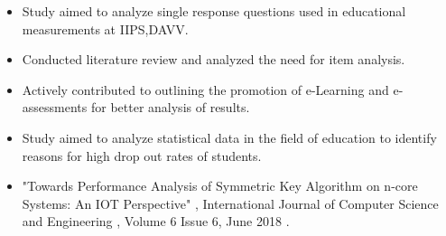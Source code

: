 \documentclass[10pt,a4paper]{altacv}
\begin{document}
\begin{itemize}
\item Study aimed to analyze single response questions used in educational measurements at IIPS,DAVV.
\item Conducted literature review and analyzed the need for item analysis.
\end{itemize}

\begin{itemize}
\item  Actively contributed to outlining the promotion of e-Learning and e-assessments for better analysis of results.
\end{itemize}

\begin{itemize}
\item Study aimed to analyze statistical data in the field of education to identify reasons for high drop out rates of students.
\end{itemize}


\begin{itemize}
\item "Towards Performance Analysis of Symmetric Key Algorithm on n-core Systems: An IOT Perspective" , International Journal of Computer Science and Engineering , Volume 6 Issue 6, June 2018 .
\end{itemize}



\clearpage
\end{document}
